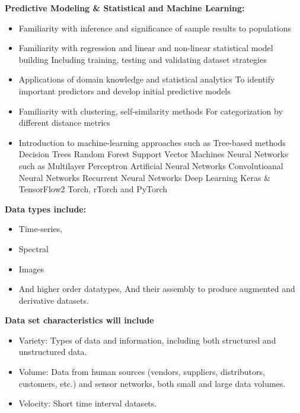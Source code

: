 \documentclass[10pt]{article} %
\begin{document}
{\bf Predictive Modeling \& Statistical and Machine Learning:}
\begin{itemize}
  \item Familiarity with inference and significance of sample results to populations
  \item Familiarity with regression and linear and non-linear statistical model building
    \subitem Including training, testing and validating dataset strategies
  \item Applications of domain knowledge and statistical analytics
    \subitem To identify important predictors and develop initial predictive models
  \item Familiarity with clustering, self-similarity methods
    \subitem For categorization by different distance metrics
  \item Introduction to machine-learning approaches such as
    \subitem Tree-based methods
      \subsubitem Decision Trees
      \subsubitem Random Forest
    \subitem Support Vector Machines
    \subitem Neural Networks such as
      \subsubitem Multilayer Perceptron
      \subsubitem Artificial Neural Networks
      \subsubitem Convolutioanal Neural Networks
      \subsubitem Recurrent Neural Networks
    \subitem Deep Learning
      \subsubitem Keras \& TensorFlow2
      \subsubitem Torch, rTorch and PyTorch
\end{itemize}

{\bf Data types include:}
\begin{itemize}
  \item Time-series,
  \item Spectral
  \item Images
  \item And higher order datatypes,
    \subitem And their assembly to produce augmented and derivative datasets.
\end{itemize}

{\bf Data set characteristics will include}
\begin{itemize}
  \item Variety: Types of data and information, including both structured and unstructured data.
  \item Volume: Data from human sources (vendors, suppliers, distributors, customers, etc.) and sensor networks,  both small and large data volumes.
  \item Velocity: Short time interval datasets.
\end{itemize}


\end{document}
